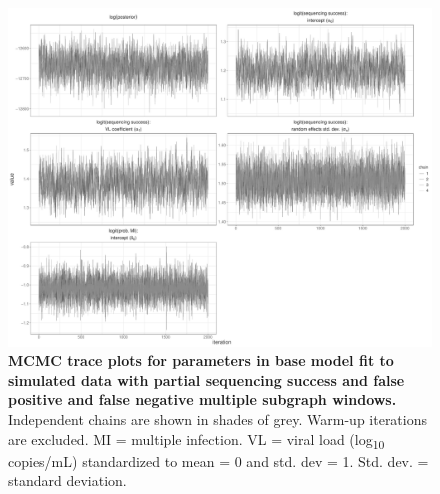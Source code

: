 \documentclass[10pt,letterpaper]{article}
\begin{document}
\begin{figure}[!ht]
 \includegraphics[width=1\textwidth]{../../figures/full_simulation_base_trace.pdf}
\caption{{\bf MCMC trace plots for parameters in base model fit to simulated data with partial sequencing success and false positive and false negative multiple subgraph windows.} Independent chains are shown in shades of grey. Warm-up iterations are excluded. MI = multiple infection. VL = viral load (log\textsubscript{10} copies/mL) standardized to mean = 0 and std. dev = 1. Std. dev. = standard deviation.  }
\end{figure}
\end{document}
